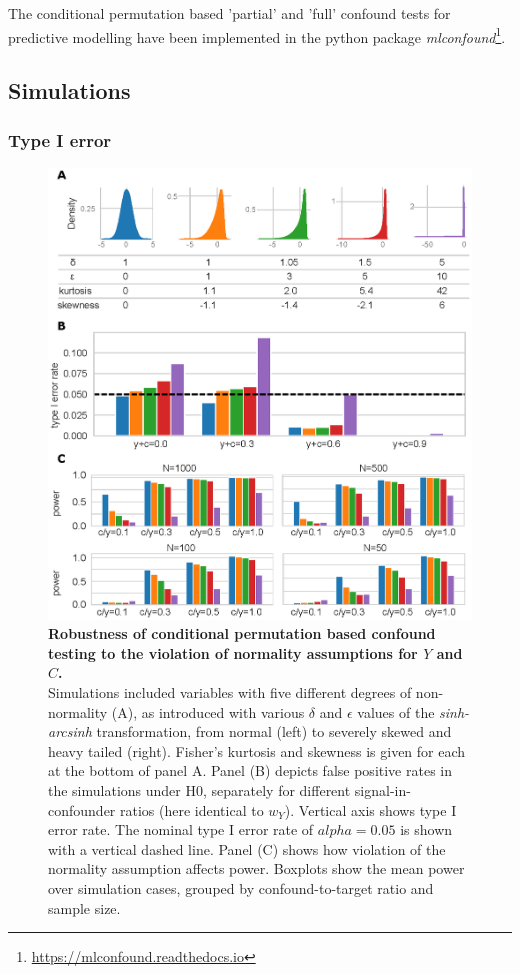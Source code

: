 \documentclass{article}
\begin{document}
The conditional permutation based 'partial' and 'full' confound tests for predictive modelling have been implemented in the python package \emph{mlconfound}\footnote{\href{https://mlconfound.readthedocs.io}{https://mlconfound.readthedocs.io}}.

\subsection{Simulations}

\subsubsection*{Type I error}

\begin{figure}[!b]
  \centering
  \includegraphics[width=0.40\paperwidth]{fig/sim_non-norm.eps}
  \caption{\textbf{Robustness of conditional permutation based confound testing to the violation of normality assumptions for $Y$ and $C$.} \\
  Simulations included variables with five different degrees of non-normality (A), as introduced with various $\delta$ and $\epsilon$ values of the \emph{sinh-arcsinh} transformation, from normal (left) to severely skewed and heavy tailed (right). Fisher's kurtosis and skewness is given for each at the bottom of panel A. Panel (B) depicts false positive rates in the simulations under H0, separately for different signal-in-confounder ratios (here identical to $w_{Y}$).
  Vertical axis shows type I error rate. The nominal type I error rate of $alpha=0.05$ is shown with a vertical dashed line. Panel (C) shows how violation of the normality assumption affects power. Boxplots show the mean power over simulation cases, grouped by confound-to-target ratio and sample size.}
  \label{fig:sim-non-normal}
\end{figure}
\end{document}
